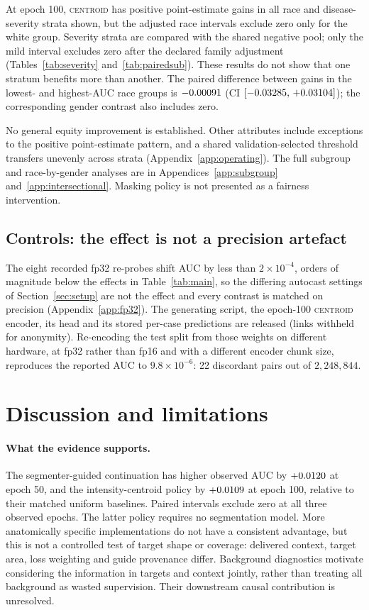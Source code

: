 \documentclass{article}
\newcommand{\ArmBest}{\textsc{centroid}}
\begin{document}
At epoch 100, \ArmBest{} has positive point-estimate gains in all race and
disease-severity strata shown, but the adjusted race intervals exclude zero
only for the white group. Severity strata are compared with the shared negative
pool; only the mild interval excludes zero after the declared family adjustment
(Tables~\ref{tab:severity} and~\ref{tab:pairedsub}). These results do not show
that one stratum benefits more than another. The paired difference between
gains in the lowest- and highest-AUC race groups is $-0.00091$
(CI $[-0.03285,\,+0.03104]$); the corresponding gender contrast also includes zero.

No general equity improvement is established. Other attributes include
exceptions to the positive point-estimate pattern, and a shared validation-selected
threshold transfers unevenly across strata (Appendix~\ref{app:operating}).
The full subgroup and race-by-gender analyses are in
Appendices~\ref{app:subgroup} and~\ref{app:intersectional}. Masking policy is
not presented as a fairness intervention.

\subsection{Controls: the effect is not a precision artefact}
\label{sec:precision}

The eight recorded fp32 re-probes shift AUC by less than
$2\times10^{-4}$, orders of magnitude below the effects in
Table~\ref{tab:main}, so the differing autocast settings of
Section~\ref{sec:setup} are not the effect and every contrast is matched on
precision (Appendix~\ref{app:fp32}). The generating script, the epoch-100
\ArmBest{} encoder, its head and its stored per-case predictions are released
(links withheld for anonymity).
Re-encoding the test split from those weights on different hardware, at fp32
rather than fp16 and with a different encoder chunk size, reproduces the
reported AUC to $9.8\times10^{-6}$: 22
discordant pairs out of $2{,}248{,}844$.

\section{Discussion and limitations}
\label{sec:limits}

\paragraph{What the evidence supports.}
The segmenter-guided continuation has higher observed AUC by
$+0.0120$ at epoch 50, and the intensity-centroid policy by
$+0.0109$ at epoch 100, relative to their matched uniform
baselines. Paired intervals exclude zero at all three observed epochs.
The latter policy requires no segmentation model. More anatomically specific
implementations do not have a consistent advantage, but this is not a controlled
test of target shape or coverage: delivered context, target area, loss weighting
and guide provenance differ. Background diagnostics motivate considering the
information in targets and context jointly, rather than treating all background
as wasted supervision. Their downstream causal contribution is unresolved.
\end{document}

